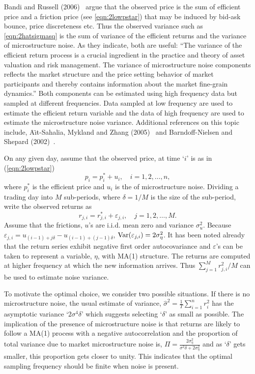 Bandi and Russell (2006)~\cite{bandi} argue that the observed price is the sum of efficient price and a friction price (see \eqref{eqn:2lowpstar}) that may be induced by bid-ask bounce, price discreteness etc. Thus the observed variance such as \eqref{eqn:2hatsigmasq} is the sum of variance of the efficient returns and the variance of microstructure noise. As they indicate, both are useful: ``The variance of the efficient return process is a crucial ingredient in the practice and theory of asset valuation and risk management. The variance of microstructure noise components reflects the market structure and the price setting behavior of market participants and thereby contains information about the market fine-grain dynamics.'' Both components can be estimated using high frequency data but sampled at different frequencies. Data sampled at low frequency are used to estimate the efficient return variable and the data of high frequency are used to estimate the microstructure noise variance. Additional references on this topic include, A{\"\i}t-Sahalia, Mykland and Zhang (2005)~\cite{ait2005often} and Barndoff-Nielsen and Shepard (2002)~\cite{barndorff2002econometric}.


On any given day, assume that the observed price, at time `$i$' is as in (\ref{eqn:2lowpstar})
	\begin{equation} \label{eqn:2pi2}
	p_i = p_i^* + u_i, \quad i= 1, 2, \ldots, n,
	\end{equation}
where $p_i^*$ is the efficient price and $u_i$ is the of microstructure noise. Dividing a trading day into $M$ sub-periods, where $\delta= 1/M$ is the size of the sub-period, write the observed returns as
	\begin{equation} \label{eqn:2rji2}
	r_{j,i} = r_{j,i}^* + \varepsilon_{j,i}, \quad j= 1,2,\ldots, M.
	\end{equation}
Assume that the frictions, $u$'s are i.i.d. mean zero and variance $\sigma_{u}^2$. Because $\varepsilon_{j,i}= u_{(i-1) + j \delta} - u_{(i-1) + (j-1)\delta}$, $\operatorname{Var}(\varepsilon_{j,i})= 2 \sigma_{\eta}^2$. It has been noted already that the return series exhibit negative first order autocovariance and $\varepsilon$'s can be taken to represent a variable, $\eta$, with MA(1) structure. The returns are computed at higher frequency at which the new information arrives. Thus $\sum_{j=1}^M r_{j,i}^2/M$ can be used to estimate noise variance. 


To motivate the optimal choice, we consider two possible situations. If there is no microstructure noise, the usual estimate of variance, $\hat{\sigma}^2= \frac{1}{T} \sum_{i=1}^n r_i^2$ has the asymptotic variance `$2\sigma^4 \delta$' which suggests selecting `$\delta$' as small as possible. The implication of the presence of microstructure noise is that returns are likely to follow a MA(1) process with a negative autocorrelation and the proportion of total variance due to market microstructure noise is, $\Pi= \frac{2\sigma_\eta^2}{\sigma^2\delta + 2\sigma_\eta^2}$ and as `$\delta$' gets smaller, this proportion gets closer to unity. This indicates that the optimal sampling frequency should be finite when noise is present.


